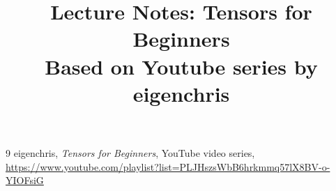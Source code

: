 \documentclass[12pt]{article}
\title{Lecture Notes: Tensors for Beginners\\
\large Based on Youtube series by eigenchris}
\author{}
\date{}
\begin{document}
\maketitle
\tableofcontents
\newpage










\begin{thebibliography}{9}
eigenchris, \textit{Tensors for Beginners}, YouTube video series,\\
\url{https://www.youtube.com/playlist?list=PLJHszsWbB6hrkmmq57lX8BV-o-YIOFsiG}
\end{thebibliography}
\end{document}
